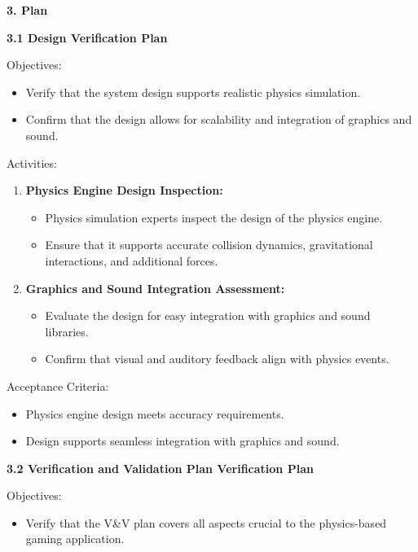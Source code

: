 \documentclass[
]{article}
\begin{document}
\protect\hypertarget{Ab1}{}{}\textbf{3. Plan}

\protect\hypertarget{Ab2}{}{}\textbf{3.1 Design Verification Plan}

Objectives:

\begin{itemize}
\item
  Verify that the system design supports realistic physics simulation.
\item
  Confirm that the design allows for scalability and integration of
  graphics and sound.
\end{itemize}

Activities:

\begin{enumerate}
\def\labelenumi{\arabic{enumi}.}
\item
  \textbf{Physics Engine Design Inspection:}

  \begin{itemize}
  \item
    Physics simulation experts inspect the design of the physics engine.
  \item
    Ensure that it supports accurate collision dynamics, gravitational
    interactions, and additional forces.
  \end{itemize}
\item
  \textbf{Graphics and Sound Integration Assessment:}

  \begin{itemize}
  \item
    Evaluate the design for easy integration with graphics and sound
    libraries.
  \item
    Confirm that visual and auditory feedback align with physics events.
  \end{itemize}
\end{enumerate}

Acceptance Criteria:

\begin{itemize}
\item
  Physics engine design meets accuracy requirements.
\item
  Design supports seamless integration with graphics and sound.
\end{itemize}

\protect\hypertarget{Ab3}{}{}\textbf{3.2 Verification and Validation
Plan Verification Plan}

Objectives:

\begin{itemize}
\item
  Verify that the V\&V plan covers all aspects crucial to the
  physics-based gaming application.
\end{itemize}
\end{document}
